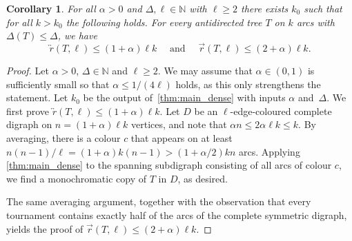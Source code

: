 \documentclass[10pt,a4paper]{amsart}
\newtheorem{corollary}{Corollary}
\def\NN{\mathbb N}
\renewcommand{\geq}{\geqslant}
\renewcommand{\leq}{\leqslant}
\begin{document}
\begin{corollary}
    For all $\alpha>0$ and $\Delta,\ell \in \NN$ with $\ell\geq 2$ there exists $k_0$ such that for all $k>k_0$ the following holds. For every antidirected tree $T$ on $k$ arcs with $\Delta(T)\leq \Delta$, we have 
    \begin{equation*}
        \overleftrightarrow{r}(T,\ell)\leq (1+\alpha)\ell k \quad \text{ and } \quad \overrightarrow r(T,\ell)\le (2+\alpha)\ell k.
    \end{equation*}
\end{corollary}

\begin{proof}
    Let $\alpha>0$, $\Delta\in \NN$ and $\ell \geq 2$.
    We may assume that $\alpha\in (0,1)$ is sufficiently small so that $\alpha\leq 1/(4\ell)$ holds, as this only strengthens the statement. Let $k_0$ be the output of~\cref{thm:main_dense} with inputs $\alpha$ and~$\Delta$.  
    We first prove $\overleftrightarrow{r}(T,\ell)\leq (1+\alpha)\ell k$.
    Let $D$ be an $\ell$-edge-coloured complete digraph on $n = (1+\alpha)\ell k$ vertices, and note that $\alpha n \leq 2\alpha \ell k \leq k$. By averaging, there is a colour $c$ that appears on at least $n(n-1)/\ell = (1+\alpha)k(n-1)> (1+\alpha/2)kn$ arcs. Applying \cref{thm:main_dense} to the spanning subdigraph consisting of all arcs of colour $c$, we find a monochromatic copy of $T$ in $D$, as desired.

    The same averaging argument, together with the observation that every tournament contains exactly half of the arcs of the complete symmetric digraph, yields the proof of $\overrightarrow r(T,\ell)\le (2+\alpha)\ell k$.
\end{proof}
\end{document}
